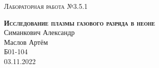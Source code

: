 \documentclass[12pt,a4paper]{extreport}
\begin{document}
	
	\begin{center}
		\large
		\textsc{Лабораторная работа №3.5.1}
		
		\LARGE
		\textbf{\textsc{Исследование плазмы газового разряда в неоне}}
		\\[5mm]
		
		\large
		Симанкович Александр\\
		Маслов Артём\\
		Б01-104
		\\[3mm]
		03.11.2022
	\end{center}
	
	
	
	
	
	
	
	\newpage
	
	
	
	
	
	
	
	
	
\end{document}
